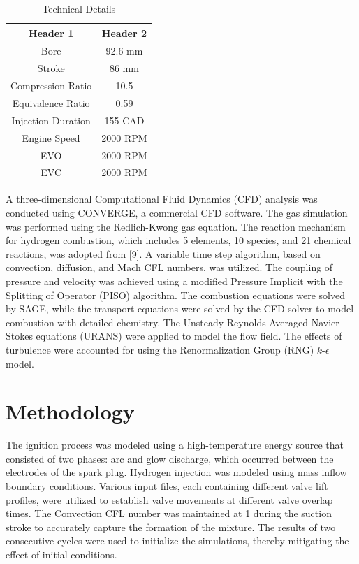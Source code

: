 \documentclass[conference]{IEEEtran}
\begin{document}
\begin{table}[!ht]
    \centering
    \caption{Technical Details}
    \label{your_label_here}
    \begin{tabular}{|c|c|}
    \hline
    Header 1 & Header 2 \\
    \hline
    Bore & 92.6 mm \\
    Stroke & 86 mm \\
    Compression Ratio & 10.5 \\
    Equivalence Ratio & 0.59 \\
    Injection Duration & 155 CAD \\
    Engine Speed & 2000 RPM \\
    EVO & 2000 RPM \\
    EVC & 2000 RPM \\
    \hline
    \end{tabular}
    \end{table}

A three-dimensional Computational Fluid Dynamics (CFD) analysis was conducted using CONVERGE, a commercial CFD software. The gas simulation was performed using the Redlich-Kwong gas equation. The reaction mechanism for hydrogen combustion, which includes 5 elements, 10 species, and 21 chemical reactions, was adopted from [9]. A variable time step algorithm, based on convection, diffusion, and Mach CFL numbers, was utilized. The coupling of pressure and velocity was achieved using a modified Pressure Implicit with the Splitting of Operator (PISO) algorithm. The combustion equations were solved by SAGE, while the transport equations were solved by the CFD solver to model combustion with detailed chemistry. The Unsteady Reynolds Averaged Navier-Stokes equations (URANS) were applied to model the flow field. The effects of turbulence were accounted for using the Renormalization Group (RNG) $k$-$\epsilon$ model.

\section{Methodology}

The ignition process was modeled using a high-temperature energy source that consisted of two phases: arc and glow discharge, which occurred between the electrodes of the spark plug. Hydrogen injection was modeled using mass inflow boundary conditions. Various input files, each containing different valve lift profiles, were utilized to establish valve movements at different valve overlap times. The Convection CFL number was maintained at 1 during the suction stroke to accurately capture the formation of the mixture. The results of two consecutive cycles were used to initialize the simulations, thereby mitigating the effect of initial conditions.\\
\end{document}
